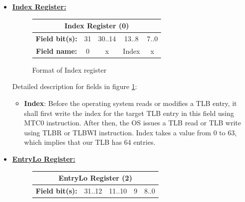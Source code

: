 \documentclass[]{scrartcl}
\begin{document}
\begin{itemize}

\item \textbf{\underline{Index Register:}}\\

\begin{figure}[H]
\begin{center}
\begin{tabular}{|c|c|c|c|c|}

\hline \multicolumn{5}{|c|}{Index Register (0)} \\

\hline \textbf{Field bit(s):} & 31 & 30..14 & 13..8 & 7..0 \\

\hline \textbf{Field name:}   & 0  & x      & Index & x    \\

\hline

\end{tabular}

\end{center}
\caption{Format of Index register}
\label{index_reg}
\end{figure}

Detailed description for fields in figure \ref{index_reg}:

\begin{itemize}

\item \textbf{Index}: Before the operating system reads
      or modifies a TLB entry, it shall first write the 
      index for the target TLB entry in this field using
      MTC0 instruction. After then, the OS issues a TLB
      read or TLB write using TLBR or TLBWI instruction.
      Index takes a value from 0 to 63, which implies
      that our TLB has 64 entries.

\end{itemize}

\item \textbf{\underline{EntryLo Register:}}\\

\begin{figure}[H]
\begin{center}
\begin{tabular}{|c|c|c|c|c|}

\hline \multicolumn{5}{|c|}{EntryLo Register (2)} \\

\hline \textbf{Field bit(s):} & 31..12 & 11..10 & 9 & 8..0 \\


\end{tabular}
\end{center}
\end{figure}
\end{itemize}
\end{document}
